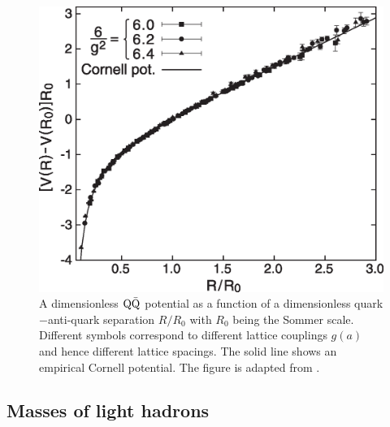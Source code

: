 \begin{figure}[t]
\begin{center}
\includegraphics[scale=0.5]{Chapter3-figures/QQbar-pot.eps} 
 \end{center}
\caption{A dimensionless ${\rm Q}\bar{\rm Q}$ potential as a 
 function of a dimensionless quark$-$anti-quark
 separation $R/R_0$ with $R_0$ being the Sommer scale. 
 Different  symbols correspond to different lattice couplings
  $g(a)$    and hence different lattice spacings. 
  The solid line shows an empirical Cornell potential. 
  The figure is adapted from \cite{Bali:2000gf}.
  }
\label{fig:QQbar-pot}
\end{figure}


\subsection{Masses of light hadrons}

